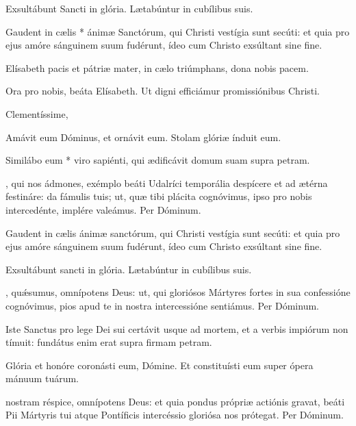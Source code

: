 \documentclass[fontsize=9pt,paper=A6,twoside,BCOR=1mm,DIV=22,headinclude]{scrarticle}
\renewcommand\A{\Ant}
\begin{document}
\begin{multicols}{2}
\V Exsultábunt Sancti in glória.
\R Lætabúntur in cubílibus suis.

 Gaudent in cælis * ánimæ Sanctórum, qui Christi vestígia sunt secúti: et quia pro ejus amóre sánguinem suum fudérunt, ídeo cum Christo exsúltant sine fine.


\A Elísabeth pacis et pátriæ mater, in cælo triúmphans, dona nobis pacem.

\V Ora pro nobis, beáta Elísabeth.
\R Ut digni efficiámur promissiónibus Christi.

 Clementíssime, 




\V Amávit eum Dóminus, et ornávit eum.
\R Stolam glóriæ índuit eum.

 Similábo eum * viro sapiénti, qui ædificávit domum suam supra petram.

{
, qui nos ádmones, exémplo beáti Udalríci temporália despícere et ad ætérna festináre: da fámulis tuis; ut, quæ tibi plácita cognóvimus, ipso pro nobis intercedénte, implére valeámus. Per Dóminum.


\A Gaudent in cælis ánimæ sanctórum, qui Christi vestígia sunt secúti: et quia pro ejus amóre sánguinem suum fudérunt, ídeo cum Christo exsúltant sine fine.

\V Exsultábunt sancti in glória.
\R Lætabúntur in cubílibus suis.

, quǽsumus, omnípotens Deus: ut, qui gloriósos Mártyres fortes in sua confessióne cognóvimus, pios apud te in nostra intercessióne sentiámus. \red{(}Per Dóminum.\red{)}


\A Iste Sanctus pro lege Dei sui certávit usque ad mortem, et a verbis impiórum non tímuit: fundátus enim erat supra firmam petram.

}

\V Glória et honóre coronásti eum, Dómine.
\R Et constituísti eum super ópera mánuum tuárum.

 nostram réspice, omnípotens Deus: et quia pondus própriæ actiónis gravat, beáti Pii Mártyris tui atque Pontíficis intercéssio gloriósa nos prótegat. Per Dóminum.


\end{multicols}
\end{document}
